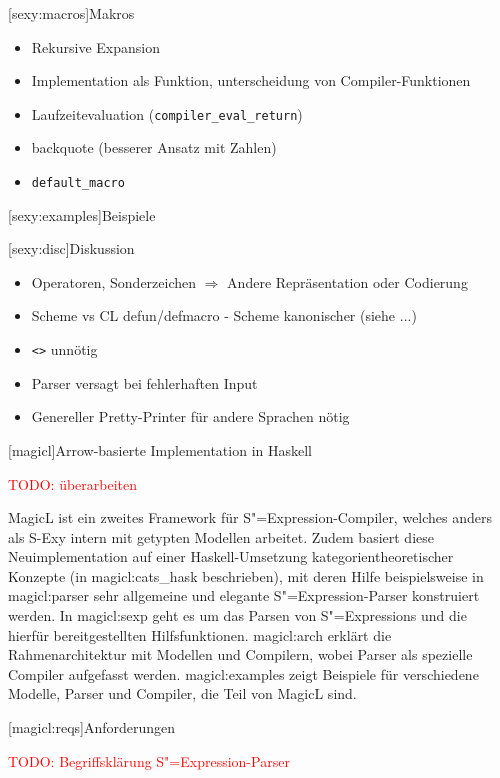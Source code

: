 \documentclass[a4paper, bibgerm]{book}
\newcommand\icode[1]{\lstinline?#1?}
\newcommand{\todo}[1]{
  \textcolor{red}{TODO: #1}
}
\newcommand\lchapter{}
\newcommand\lsection{}
\newcommand\sref{}
\newcommand{\sexy}{S-Exy}
\newcommand{\sexp}{S"=Expression}
\newcommand{\sexps}{S"=Expressions}
\begin{document}
\lsection[sexy:macros]{Makros}

\begin{itemize}
\item Rekursive Expansion
\item Implementation als Funktion, unterscheidung von Compiler-Funktionen
\item Laufzeitevaluation (\icode{compiler_eval_return})
\item backquote (besserer Ansatz mit Zahlen)
\item \icode{default_macro}
\end{itemize}
\lsection[sexy:examples]{Beispiele}

\lsection[sexy:disc]{Diskussion}

\begin{itemize}
\item Operatoren, Sonderzeichen $\Rightarrow$ Andere
  Repräsentation oder Codierung
\item Scheme vs CL defun/defmacro - Scheme kanonischer (siehe ...)
\item \icode{<>} unnötig
\item Parser versagt bei fehlerhaften Input
\item Genereller Pretty-Printer für andere Sprachen nötig
\end{itemize}

\lchapter[magicl]{Arrow-basierte Implementation in Haskell}

\todo{überarbeiten}

MagicL ist ein zweites Framework für \sexp-Compiler, welches anders
als \sexy{} intern mit getypten Modellen arbeitet. Zudem basiert diese
Neuimplementation auf einer Haskell-Umsetzung kategorientheoretischer
Konzepte (in \sref{magicl:cats_hask} beschrieben), mit deren Hilfe
beispielsweise in \sref{magicl:parser} sehr allgemeine und elegante
\sexp{}-Parser konstruiert werden. In \sref{magicl:sexp} geht es um
das Parsen von \sexps{} und die hierfür bereitgestellten
Hilfsfunktionen. \sref{magicl:arch} erklärt die Rahmenarchitektur mit
Modellen und Compilern, wobei Parser als spezielle Compiler aufgefasst
werden. \sref{magicl:examples} zeigt Beispiele für verschiedene
Modelle, Parser und Compiler, die Teil von MagicL sind.

\lsection[magicl:reqs]{Anforderungen}

\todo{Begriffsklärung \sexp{}-Parser}
\end{document}
